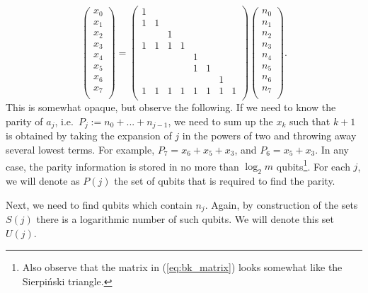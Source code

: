 \begin{equation}
    \label{eq:bk_matrix}
    \begin{pmatrix}
        x_0 \\ x_1 \\ x_2 \\ x_3 \\ x_4 \\
        x_5 \\ x_6 \\ x_7 \\
    \end{pmatrix} = 
    \begin{pmatrix}
    1 &   &   &   &   &   &   &   \\   
    1 & 1 &   &   &   &   &   &   \\
      &   & 1 &   &   &   &   &   \\
    1 & 1 & 1 & 1 &   &   &   &   \\
      &   &   &   & 1 &   &   &   \\
      &   &   &   & 1 & 1 &   &   \\
      &   &   &   &   &   & 1 &   \\
    1 & 1 & 1 & 1 & 1 & 1 & 1 & 1 \\
    \end{pmatrix} 
    \begin{pmatrix}
        n_0 \\ n_1 \\ n_2 \\ n_3 \\ n_4 \\
        n_5 \\ n_6 \\ n_7 \\
    \end{pmatrix} 
    .
\end{equation}
This is somewhat opaque, but observe the following. If we need to know the parity of $a_j$, i.e.~$P_j := n_0 + ... + n_{j-1}$, we need to sum up the $x_k$ such that $k+1$ is obtained by taking the expansion of $j$ in the powers of two and throwing away several lowest terms. For example, $P_7 = x_6 + x_5 + x_3$, and $P_6 = x_5 + x_3$. In any case, the parity information is stored in no more than $\log_2 m$ qubits\footnote{Also observe that the matrix in (\ref{eq:bk_matrix}) looks somewhat like the Sierpi\'nski triangle.}. For each $j$, we will denote as $P(j)$ the set of qubits that is required to find the parity.

Next, we need to find qubits which contain $n_j$. Again, by construction of the sets $S(j)$ there is a logarithmic number of such qubits. We will denote this set $U(j)$.

